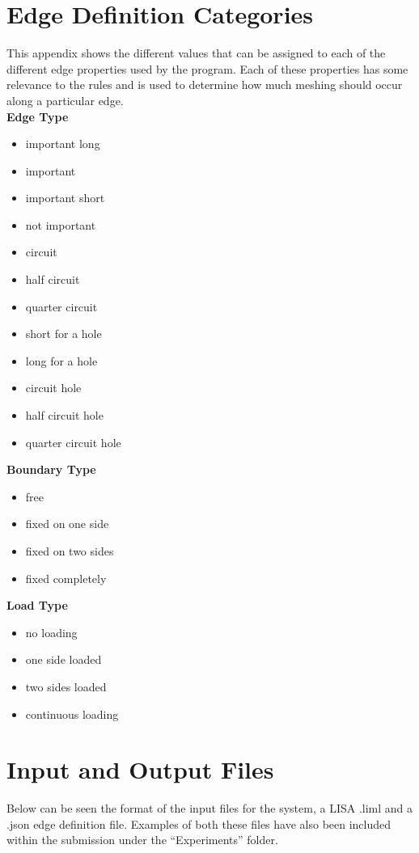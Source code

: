 
\newpage
\section{Edge Definition Categories}
This appendix shows the different values that can be assigned to each of the different edge properties used by the program. Each of these properties has some relevance to the rules and is used to determine how much meshing should occur along a particular edge. \\ 

\textbf{Edge Type}
\begin{itemize}
  \item important long
  \item important
  \item important short
  \item not important
  \item circuit
  \item half circuit
  \item quarter circuit
  \item short for a hole
  \item long for a hole
  \item circuit hole
  \item half circuit hole
  \item quarter circuit hole
\end{itemize}

\textbf{Boundary Type}
\begin{itemize}
  \item free
  \item fixed on one side
  \item fixed on two sides
  \item fixed completely
\end{itemize}

\textbf{Load Type}
\begin{itemize}
  \item no loading
  \item one side loaded
  \item two sides loaded
  \item continuous loading
\end{itemize}

\newpage

\section{Input and Output Files}
Below can be seen the format of the input files for the system, a LISA .liml and a .json edge definition file. Examples of both these files have also been included within the submission under the ``Experiments'' folder. \\

